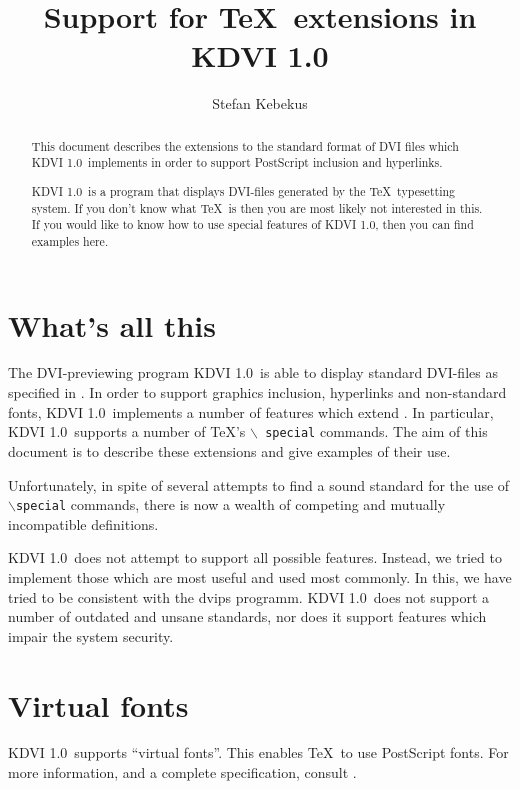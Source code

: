 \documentclass{article}
\newcommand{\KDVI}{{\sf KDVI 1.0}}
\begin{document}
\title{Support for \TeX\ extensions in \KDVI}

\author{Stefan Kebekus}

\maketitle
\begin{abstract}
  This document describes the extensions to the standard format of DVI
  files which \KDVI\ implements in order to support PostScript
  inclusion and hyperlinks.
  
  \KDVI\ is a program that displays DVI-files generated by the \TeX\ 
  typesetting system. If you don't know what \TeX\ is then you are
  most likely not interested in this. If you would like to know how to
  use special features of \KDVI, then you can find examples here.
\end{abstract}

\tableofcontents

\section{What's all this}

The DVI-previewing program \KDVI\ is able to display standard
DVI-files as specified in \cite{Level0Std}. In order to support
graphics inclusion, hyperlinks and non-standard fonts, \KDVI\ 
implements a number of features which extend \cite{Level0Std}. In
particular, \KDVI\ supports a number of \TeX 's $\backslash${\tt
  special} commands. The aim of this document is to describe these
extensions and give examples of their use.

Unfortunately, in spite of several attempts to find a sound standard
for the use of $\backslash${\tt special} commands, there is now a
wealth of competing and mutually incompatible definitions.

\KDVI\ does not attempt to support all possible features. Instead, we
tried to implement those which are most useful and used most commonly.
In this, we have tried to be consistent with the {\sf dvips} programm.
\KDVI\ does not support a number of outdated and unsane standards, nor
does it support features which impair the system security.


\section{Virtual fonts}

\KDVI\ supports ``virtual fonts''. This enables \TeX\ to use
PostScript fonts. For more information, and a complete specification,
consult \cite{dvips}.
\end{document}

